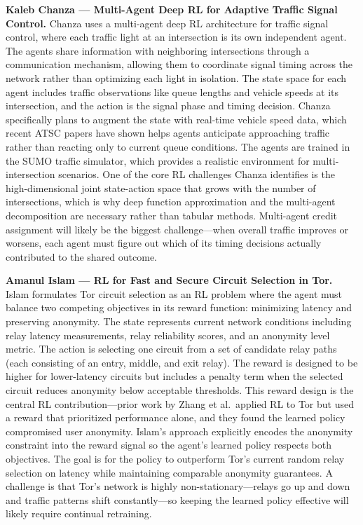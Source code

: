 \documentclass[letterpaper]{article}
\begin{document}
\textbf{Kaleb Chanza --- Multi-Agent Deep RL for Adaptive Traffic Signal Control.}
Chanza uses a multi-agent deep RL architecture for traffic signal control, where each traffic light at an intersection is its own independent agent. The agents share information with neighboring intersections through a communication mechanism, allowing them to coordinate signal timing across the network rather than optimizing each light in isolation. The state space for each agent includes traffic observations like queue lengths and vehicle speeds at its intersection, and the action is the signal phase and timing decision. Chanza specifically plans to augment the state with real-time vehicle speed data, which recent ATSC papers have shown helps agents anticipate approaching traffic rather than reacting only to current queue conditions. The agents are trained in the SUMO traffic simulator, which provides a realistic environment for multi-intersection scenarios. One of the core RL challenges Chanza identifies is the high-dimensional joint state-action space that grows with the number of intersections, which is why deep function approximation and the multi-agent decomposition are necessary rather than tabular methods. Multi-agent credit assignment will likely be the biggest challenge---when overall traffic improves or worsens, each agent must figure out which of its timing decisions actually contributed to the shared outcome.

\vspace{0.5em}

\textbf{Amanul Islam --- RL for Fast and Secure Circuit Selection in Tor.}
Islam formulates Tor circuit selection as an RL problem where the agent must balance two competing objectives in its reward function: minimizing latency and preserving anonymity. The state represents current network conditions including relay latency measurements, relay reliability scores, and an anonymity level metric. The action is selecting one circuit from a set of candidate relay paths (each consisting of an entry, middle, and exit relay). The reward is designed to be higher for lower-latency circuits but includes a penalty term when the selected circuit reduces anonymity below acceptable thresholds. This reward design is the central RL contribution---prior work by Zhang et al.\ applied RL to Tor but used a reward that prioritized performance alone, and they found the learned policy compromised user anonymity. Islam's approach explicitly encodes the anonymity constraint into the reward signal so the agent's learned policy respects both objectives. The goal is for the policy to outperform Tor's current random relay selection on latency while maintaining comparable anonymity guarantees. A challenge is that Tor's network is highly non-stationary---relays go up and down and traffic patterns shift constantly---so keeping the learned policy effective will likely require continual retraining.
\end{document}
